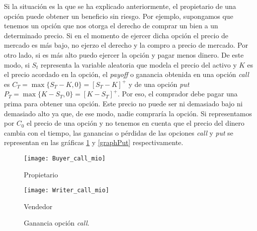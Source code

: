 Si la situación es la que se ha explicado anteriormente, el propietario de una opción puede obtener un beneficio sin riesgo. Por ejemplo, supongamos que tenemos un opción que nos otorga el derecho de comprar un bien a un determinado precio. Si en el momento de ejercer dicha opción el precio de mercado es más bajo, no ejerzo el derecho y la compro a precio de mercado. Por otro lado, si es más alto puedo ejercer la opción y pagar menos dinero. De este modo, si $ S_t $ representa la variable aleatoria que modela el precio del activo y $ K $ es el precio acordado en la opción, el \textit{payoff} o ganancia obtenida en una opción \textit{call} es $ C_T = \max\{S_T-K, 0\} = \left[S_T - K\right]^+ $ y de una opción \textit{put} $ P_T = \max\{K-S_T, 0\} = \left[K-S_T\right]^+ $. Por eso, el comprador debe pagar una prima para obtener una opción. Este precio no puede ser ni demasiado bajo ni demasiado alto ya que, de ese modo, nadie compraría la opción. Si representamos por $ C_0 $ el precio de una opción y no tenemos en cuenta que el precio del dinero cambia con el tiempo, las ganancias o pérdidas de las opciones \textit{call} y \textit{put} se representan en las gráficas \ref{graphCall} y \ref{graphPut} respectivamente.  \\

\begin{figure}[h!]
	\begin{minipage}{0.5\textwidth}
		\centering
		\texttt{[image: Buyer\_call\_mio]} 
		\caption*{Propietario}
	\end{minipage}
	\begin{minipage}{0.5\textwidth}
		\texttt{[image: Writer\_call\_mio]}
		\caption*{Vendedor}
		
	\end{minipage}
	\caption{Ganancia opción \textit{call}.}
	\label{graphCall}
\end{figure}

